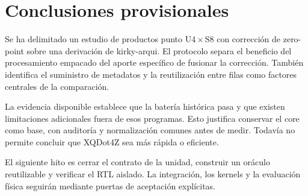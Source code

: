 \section{Conclusiones provisionales}
Se ha delimitado un estudio de productos punto U4\,$\times$\,S8 con corrección
de zero-point sobre una derivación de kirky-arqui. El protocolo separa el
beneficio del procesamiento empacado del aporte específico de fusionar la
corrección. También identifica el suministro de metadatos y la reutilización
entre filas como factores centrales de la comparación.

La evidencia disponible establece que la batería histórica pasa y que existen
limitaciones adicionales fuera de esos programas. Esto justifica conservar
el core como base, con auditoría y normalización comunes antes de medir.
Todavía no permite concluir que XQDot4Z sea más rápida o eficiente.

El siguiente hito es cerrar el contrato de la unidad, construir un oráculo
reutilizable y verificar el RTL aislado. La integración, los kernels y la
evaluación física seguirán mediante puertas de aceptación explícitas.
